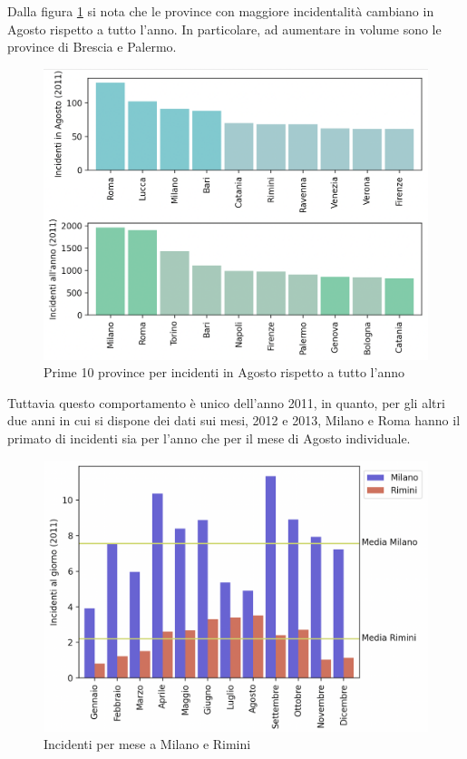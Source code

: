 \documentclass[a4paper]{report}
\begin{document}
Dalla figura \ref{fig:mesi-estivi} si nota che le province con maggiore incidentalità 
cambiano in Agosto rispetto a tutto l'anno. In particolare, ad aumentare in volume sono le 
province di Brescia e Palermo.

\begin{figure}
    \includegraphics[width=\linewidth]{../src/incidenti/incidenti_senza_coords/mese_incidenti/mesi_estivi.png}
    \caption{Prime 10 province per incidenti in Agosto rispetto a tutto l'anno}
    \label{fig:mesi-estivi}
\end{figure}

Tuttavia questo comportamento è unico dell'anno 2011, in quanto, per gli altri due anni in cui 
si dispone dei dati sui mesi, 2012 e 2013, Milano e Roma hanno il primato di 
incidenti sia per l'anno che per il mese di Agosto individuale.



\begin{figure}
    \includegraphics[width=\linewidth]{../src/incidenti/incidenti_senza_coords/mese_incidenti/milano_rimini.png}
    \caption{Incidenti per mese a Milano e Rimini}
    \label{fig:milano-rimini}
\end{figure}
\end{document}
